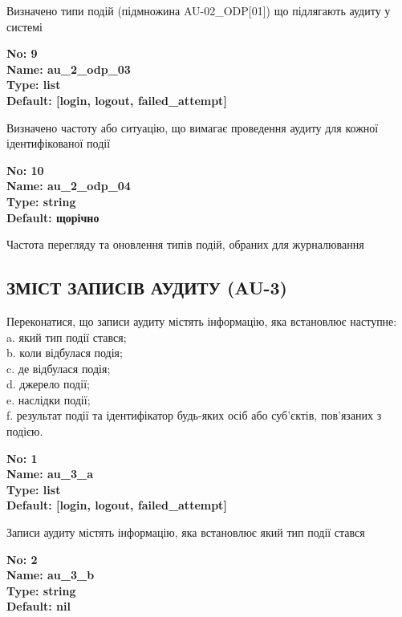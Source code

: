 \documentclass{article}
\begin{document}
{\footnotesize Визначено типи подій (підмножина AU-02\_\allowbreak{}ODP[01]) що підлягають аудиту у системі}


{\footnotesize\bfseries
No: 9\\
Name: au\_\allowbreak{}2\_\allowbreak{}odp\_\allowbreak{}03\\
Type: list\\
Default: [\textquotedbl{}login\textquotedbl{}, \textquotedbl{}logout\textquotedbl{}, \textquotedbl{}failed\_\allowbreak{}attempt\textquotedbl{}]
}

{\footnotesize Визначено частоту або ситуацію, що вимагає проведення аудиту для кожної ідентифікованої події}


{\footnotesize\bfseries
No: 10\\
Name: au\_\allowbreak{}2\_\allowbreak{}odp\_\allowbreak{}04\\
Type: string\\
Default: \textquotedbl{}щорічно\textquotedbl{}
}

{\footnotesize Частота перегляду та оновлення типів подій, обраних для журналювання}




\subsection{ЗМІСТ ЗАПИСІВ АУДИТУ (AU-3)}
Переконатися, що записи аудиту містять інформацію, яка встановлює наступне:\\ 
a. який тип події стався;\\ 
b. коли відбулася подія;\\ 
c. де відбулася подія;\\ 
d. джерело події;\\ 
e. наслідки події;\\ 
f. результат події та ідентифікатор будь-яких осіб або суб'єктів, пов'язаних з подією.

\vspace{10pt}
{\footnotesize\bfseries
No: 1\\
Name: au\_\allowbreak{}3\_\allowbreak{}a\\
Type: list\\
Default: [\textquotedbl{}login\textquotedbl{}, \textquotedbl{}logout\textquotedbl{}, \textquotedbl{}failed\_\allowbreak{}attempt\textquotedbl{}]
}

{\footnotesize Записи аудиту містять інформацію, яка встановлює який тип події стався}


{\footnotesize\bfseries
No: 2\\
Name: au\_\allowbreak{}3\_\allowbreak{}b\\
Type: string\\
Default: nil
}
\end{document}
